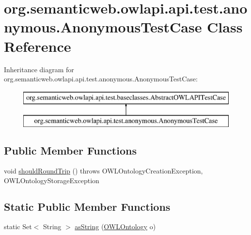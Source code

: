 \hypertarget{classorg_1_1semanticweb_1_1owlapi_1_1api_1_1test_1_1anonymous_1_1_anonymous_test_case}{\section{org.\-semanticweb.\-owlapi.\-api.\-test.\-anonymous.\-Anonymous\-Test\-Case Class Reference}
\label{classorg_1_1semanticweb_1_1owlapi_1_1api_1_1test_1_1anonymous_1_1_anonymous_test_case}
}
Inheritance diagram for org.\-semanticweb.\-owlapi.\-api.\-test.\-anonymous.\-Anonymous\-Test\-Case\-:\begin{figure}[H]
\begin{center}
\leavevmode
\includegraphics[height=2.000000cm]{classorg_1_1semanticweb_1_1owlapi_1_1api_1_1test_1_1anonymous_1_1_anonymous_test_case}
\end{center}
\end{figure}
\subsection*{Public Member Functions}
\begin{DoxyCompactItemize}
\item 
void \hyperlink{classorg_1_1semanticweb_1_1owlapi_1_1api_1_1test_1_1anonymous_1_1_anonymous_test_case_a24da0eb3bedc4b50386eb34b69826da6}{should\-Round\-Trip} ()  throws O\-W\-L\-Ontology\-Creation\-Exception,             O\-W\-L\-Ontology\-Storage\-Exception 
\end{DoxyCompactItemize}
\subsection*{Static Public Member Functions}
\begin{DoxyCompactItemize}
\item 
static Set$<$ String $>$ \hyperlink{classorg_1_1semanticweb_1_1owlapi_1_1api_1_1test_1_1anonymous_1_1_anonymous_test_case_af74476571062d804a4964c79d2f7c9b7}{as\-String} (\hyperlink{interfaceorg_1_1semanticweb_1_1owlapi_1_1model_1_1_o_w_l_ontology}{O\-W\-L\-Ontology} o)
\end{DoxyCompactItemize}
